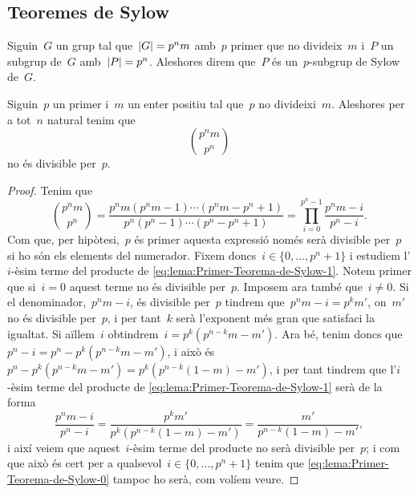 \documentclass[../../main.tex]{subfiles}
\begin{document}
    \subsection{Teoremes de Sylow}
    \begin{definition}
        \label{def:p-subgrup-de-Sylow}
        Siguin~\(G\) un grup tal que~\(\abs{G}=p^{n}m\) amb~\(p\) primer que no divideix~\(m\) i~\(P\) un subgrup de~\(G\) amb~\(\abs{P}=p^{n}\).
        Aleshores direm que~\(P\) és un~\(p\)-subgrup de Sylow de~\(G\).
    \end{definition}
    \begin{lemma}
        \label{lema:Primer-Teorema-de-Sylow}
        Siguin~\(p\) un primer i~\(m\) un enter positiu tal que~\(p\) no divideixi~\(m\).
        Aleshores per a tot~\(n\) natural tenim que
        \begin{equation}
            \label{eq:lema:Primer-Teorema-de-Sylow-0}
            \binom{p^{n}m}{p^{n}}
        \end{equation}
        no és divisible per~\(p\).
    \end{lemma}
    \begin{proof}
        Tenim que
        \begin{equation}
            \label{eq:lema:Primer-Teorema-de-Sylow-1}
            \binom{p^{n}m}{p^{n}}
            =\frac{p^{n}m(p^{n}m-1)\cdots(p^{n}m-p^{n}+1)}{p^{n}(p^{n}-1)\cdots(p^{n}-p^{n}+1)}=\prod_{i=0}^{p^{n}-1}\frac{p^{n}m-i}{p^{n}-i}.
        \end{equation}
        Com que, per hipòtesi,~\(p\) és primer aquesta expressió només serà divisible per~\(p\) si ho són els elements del numerador.
        Fixem doncs~\(i\in\{0,\dots,p^{n}+1\}\) i estudiem l'\(i\)-èsim terme del producte de \eqref{eq:lema:Primer-Teorema-de-Sylow-1}.
        Notem primer que si~\(i=0\) aquest terme no és divisible per~\(p\).
        Imposem ara també que~\(i\neq0\).
        Si el denominador,~\(p^{n}m-i\), és divisible per~\(p\) tindrem que~\(p^{n}m-i=p^{k}m'\), on~\(m'\) no és divisible per~\(p\), i per tant~\(k\) serà l'exponent més gran que satisfaci la igualtat.
        Si aïllem~\(i\) obtindrem~\(i=p^{k}(p^{n-k}m-m')\).
        Ara bé, tenim doncs que~\(p^{n}-i=p^{n}-p^{k}(p^{n-k}m-m')\), i això és~\(p^{n}-p^{k}(p^{n-k}m-m')=p^{k}(p^{n-k}(1-m)-m')\), i per tant tindrem que l'\(i\)-èsim terme del producte de \eqref{eq:lema:Primer-Teorema-de-Sylow-1} serà de la forma
        \[
            \frac{p^{n}m-i}{p^{n}-i}=\frac{p^{k}m'}{p^{k}(p^{n-k}(1-m)-m')}=\frac{m'}{p^{n-k}(1-m)-m'},
        \]
        i així veiem que aquest~\(i\)-èsim terme del producte no serà divisible per~\(p\); i com que això és cert per a qualsevol~\(i\in\{0,\dots,p^{n}+1\}\) tenim que \eqref{eq:lema:Primer-Teorema-de-Sylow-0} tampoc ho serà, com volíem veure.
    \end{proof}
\end{document}

